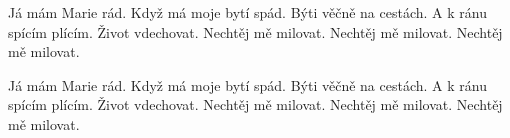 \beginchorus{}
Já mám Marie rád. Když má moje bytí spád.
Býti věčně na cestách. A k ránu spícím plícím.
Život vdechovat. Nechtěj mě milovat.
Nechtěj mě milovat. Nechtěj mě milovat. 
\endchorus{}

\beginchorus{}
Já mám Marie rád. Když má moje bytí spád.
Býti věčně na cestách. A k ránu spícím plícím.
Život vdechovat. Nechtěj mě milovat.
Nechtěj mě milovat. Nechtěj mě milovat. 
\endchorus{}

\endsong{}
